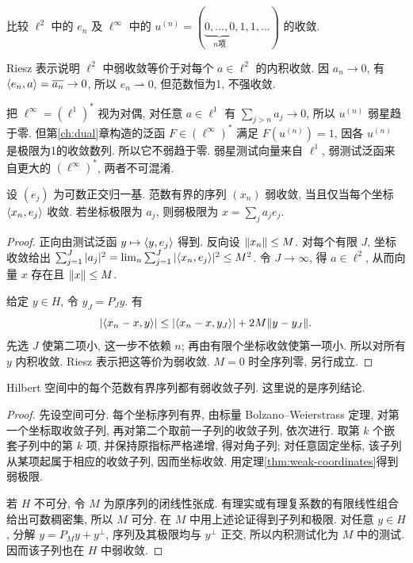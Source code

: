 \begin{example}\label{legacy:ch08:example1}
比较 $\ell^2$ 中的 $e_n$ 及 $\ell^\infty$ 中的 $u^{(n)}=(\underbrace{0,\ldots,0}_{n\text{项}},1,1,\ldots)$ 的收敛.
\end{example}
\begin{solution}
Riesz 表示说明 $\ell^2$ 中弱收敛等价于对每个 $a\in\ell^2$ 的内积收敛. 因 $a_n\to0$, 有 $\langle e_n,a\rangle=\overline{a_n}\to0$, 所以 $e_n\rightharpoonup0$, 但范数恒为1, 不强收敛.

把 $\ell^\infty=(\ell^1)^*$ 视为对偶, 对任意 $a\in\ell^1$ 有 $\sum_{j>n}a_j\to0$, 所以 $u^{(n)}$ 弱星趋于零. 但第\ref{ch:dual}章构造的泛函 $F\in(\ell^\infty)^*$ 满足 $F(u^{(n)})=1$, 因各 $u^{(n)}$ 是极限为1的收敛数列. 所以它不弱趋于零. 弱星测试向量来自 $\ell^1$, 弱测试泛函来自更大的 $(\ell^\infty)^*$, 两者不可混淆.
\end{solution}

\begin{theorem}\label{thm:weak-coordinates}
设 $(e_j)$ 为可数正交归一基. 范数有界的序列 $(x_n)$ 弱收敛, 当且仅当每个坐标 $\langle x_n,e_j\rangle$ 收敛. 若坐标极限为 $a_j$, 则弱极限为 $x=\sum_ja_je_j$.
\end{theorem}
\begin{proof}
正向由测试泛函 $y\mapsto\langle y,e_j\rangle$ 得到. 反向设 $\lVert x_n\rVert\le M$. 对每个有限 $J$, 坐标收敛给出 $\sum_{j=1}^J|a_j|^2=\lim_n\sum_{j=1}^J|\langle x_n,e_j\rangle|^2\le M^2$. 令 $J\to\infty$, 得 $a\in\ell^2$, 从而向量 $x$ 存在且 $\lVert x\rVert\le M$.

给定 $y\in H$, 令 $y_J=P_Jy$. 有
\[
|\langle x_n-x,y\rangle|\le |\langle x_n-x,y_J\rangle|+2M\lVert y-y_J\rVert.
\]
先选 $J$ 使第二项小, 这一步不依赖 $n$; 再由有限个坐标收敛使第一项小. 所以对所有 $y$ 内积收敛. Riesz 表示把这等价为弱收敛. $M=0$ 时全序列零, 另行成立.
\end{proof}

\begin{theorem}\label{thm:weaksubsequence}
Hilbert 空间中的每个范数有界序列都有弱收敛子列. 这里说的是序列结论.
\end{theorem}
\begin{proof}
先设空间可分. 每个坐标序列有界, 由标量 Bolzano--Weierstrass 定理, 对第一个坐标取收敛子列, 再对第二个取前一子列的收敛子列, 依次进行. 取第 $k$ 个嵌套子列中的第 $k$ 项, 并保持原指标严格递增, 得对角子列; 对任意固定坐标, 该子列从某项起属于相应的收敛子列, 因而坐标收敛. 用定理\ref{thm:weak-coordinates}得到弱极限.

若 $H$ 不可分, 令 $M$ 为原序列的闭线性张成. 有理实或有理复系数的有限线性组合给出可数稠密集, 所以 $M$ 可分. 在 $M$ 中用上述论证得到子列和极限. 对任意 $y\in H$, 分解 $y=P_My+y^\perp$, 序列及其极限均与 $y^\perp$ 正交, 所以内积测试化为 $M$ 中的测试. 因而该子列也在 $H$ 中弱收敛.
\end{proof}

